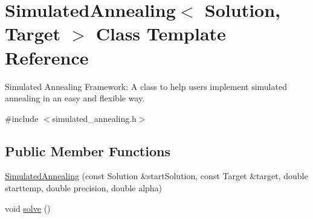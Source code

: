 \hypertarget{class_simulated_annealing}{
\section{SimulatedAnnealing$<$ Solution, Target $>$ Class Template Reference}
\label{class_simulated_annealing}
}


Simulated Annealing Framework: A class to help users implement simulated annealing in an easy and flexible way.  


{\ttfamily \#include $<$simulated\_\-annealing.h$>$}\subsection*{Public Member Functions}
\begin{DoxyCompactItemize}
\item 
\hyperlink{class_simulated_annealing_a8bb5e4492141673dea7f6803a2b95466}{SimulatedAnnealing} (const Solution \&startSolution, const Target \&target, double starttemp, double precision, double alpha)
\item 
void \hyperlink{class_simulated_annealing_ac69c1bcb744cf2946b4196afe8083f8f}{solve} ()
\end{DoxyCompactItemize}
